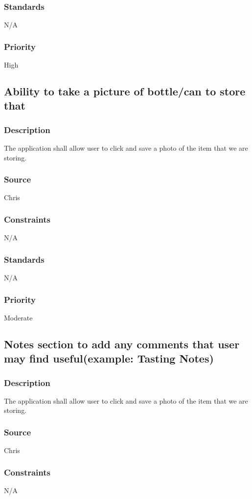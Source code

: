 \subsubsection{Standards}
N/A
\subsubsection{Priority}
High

\subsection{Ability to take a picture of bottle/can to store that}
\subsubsection{Description}
The application shall allow user to click and save a photo of the item that we are storing.
\subsubsection{Source}
Chris
\subsubsection{Constraints}
N/A
\subsubsection{Standards}
N/A
\subsubsection{Priority}
Moderate

\subsection{Notes section to add any comments that user may find useful(example: Tasting Notes)}
\subsubsection{Description}
The application shall allow user to click and save a photo of the item that we are storing.
\subsubsection{Source}
Chris
\subsubsection{Constraints}
N/A
